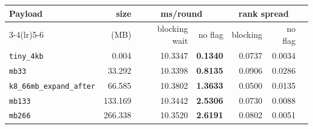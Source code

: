 \begin{tabular}{lrrrrrr}
\toprule
Payload & size & \multicolumn{2}{c}{ms/round} & \multicolumn{2}{c}{rank spread} \\
\cmidrule(lr){3-4}\cmidrule(lr){5-6}
 & (MB) & blocking wait & no flag & blocking & no flag \\
\midrule
\texttt{tiny\_4kb} & 0.004 & 10.3347 & \textbf{0.1340} & 0.0737 & 0.0034 \\
\texttt{mb33} & 33.292 & 10.3398 & \textbf{0.8135} & 0.0906 & 0.0286 \\
\texttt{k8\_66mb\_expand\_after} & 66.585 & 10.3802 & \textbf{1.3633} & 0.0500 & 0.0135 \\
\texttt{mb133} & 133.169 & 10.3442 & \textbf{2.5306} & 0.0730 & 0.0088 \\
\texttt{mb266} & 266.338 & 10.3520 & \textbf{2.6191} & 0.0802 & 0.0051 \\
\bottomrule
\end{tabular}
